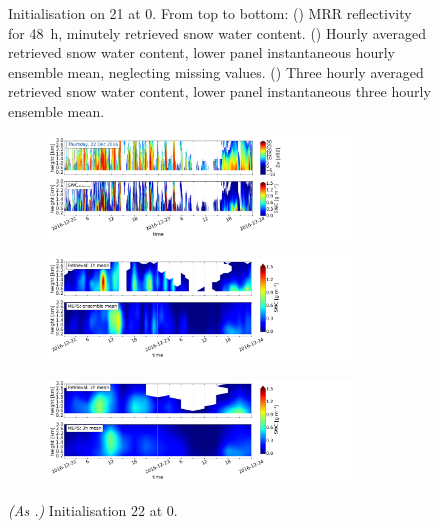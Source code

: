 \begin{figure}[H]
\begin{subfigure}[t]{1.05\textwidth}
		\caption{}\label{fig:SWC3h:21}
	\end{subfigure}
	\caption{Initialisation on \SI{21}{\dec} at \SI{0}{\UTC}. From top to bottom: (\protect{}) MRR reflectivity for \SI{48}{\hour}, minutely retrieved snow water content.
		(\protect{}) Hourly averaged retrieved snow water content, lower panel instantaneous hourly ensemble mean, %
		neglecting missing values. 
		(\protect{}) Three hourly averaged retrieved snow water content, lower panel instantaneous three hourly ensemble mean. %
	}\label{fig:SWC21}
\end{figure}
\begin{figure}[H]
	\centering
	\begin{subfigure}[t]{1.05\textwidth}
		\centering
		\includegraphics[trim={0.cm 2.2cm 19.cm 0.5cm},clip,width=0.9\textwidth]{./fig_obs_ret/20161222}
		\caption{}\label{fig:SWC:ret_22}
	\end{subfigure}
	\begin{subfigure}[t]{1.05\textwidth}
		\centering
		\includegraphics[trim={0.cm 2.2cm 19.cm 0.5cm},clip,width=0.9\textwidth]{./fig_vert_SWC_EM/20161222}
		\caption{}\label{fig:SWC_EM:22}
	\end{subfigure}
	\begin{subfigure}[t]{1.05\textwidth}
		\centering
		\includegraphics[trim={0.cm 0.8cm 19.cm 0.5cm},clip,width=0.9\textwidth]{./fig_vert_SWC_3h/20161222}
		\caption{}\label{fig:SWC3h:22}
	\end{subfigure}
	\caption{\textit{(As .)} Initialisation \SI{22}{\dec} at \SI{0}{\UTC}.}\label{fig:SWC22}
\end{figure}
